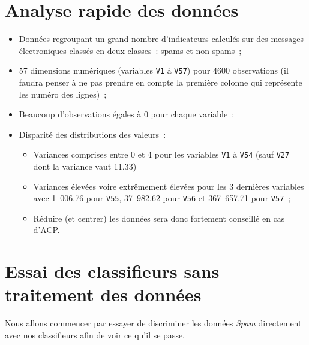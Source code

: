 \documentclass[a4paper,10pt]{report}
\begin{document}
\section{Analyse rapide des données}
\begin{itemize}
	\item Données regroupant un grand nombre d'indicateurs calculés sur des messages électroniques classés en deux classes~: spams et non spams~;
	\item 57 dimensions numériques (variables \texttt{V1} à \texttt{V57}) pour 4600 observations (il faudra penser à ne pas prendre en compte la première colonne qui représente les numéro des lignes)~;
	\item Beaucoup d'observations égales à 0 pour chaque variable~;
	\item Disparité des distributions des valeurs~:
	\begin{itemize}
		\item Variances comprises entre 0 et 4 pour les variables \texttt{V1} à \texttt{V54} (sauf \texttt{V27} dont la variance vaut 11.33)
		\item Variances élevées voire extrêmement élevées pour les 3 dernières variables avec 1~006.76 pour \texttt{V55}, 37~982.62 pour \texttt{V56} et 367~657.71 pour \texttt{V57}~;
		\item Réduire (et centrer) les données sera donc fortement conseillé en cas d'ACP.
	\end{itemize}
\end{itemize}


\section{Essai des classifieurs sans traitement des données}
\label{section:Essai-des-classifieurs-sans-traitement-des-données}
Nous allons commencer par essayer de discriminer les données \textit{Spam} directement avec nos classifieurs afin de voir ce qu'il se passe.
\end{document}
